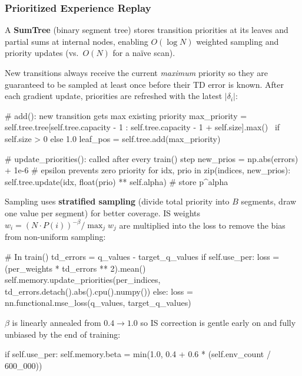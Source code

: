\documentclass[12pt,a4paper]{report}
\begin{document}
\subsubsection*{Prioritized Experience Replay}

A \textbf{SumTree} (binary segment tree) stores transition priorities at its leaves
and partial sums at internal nodes, enabling $O(\log N)$ weighted sampling and
priority updates (vs.\ $O(N)$ for a naïve scan).

New transitions always receive the current \emph{maximum} priority so they are
guaranteed to be sampled at least once before their TD error is known.
After each gradient update, priorities are refreshed with the latest $|\delta_i|$:

\begin{pycode}
# add(): new transition gets max existing priority
max_priority = self.tree.tree[self.tree.capacity - 1 :
                              self.tree.capacity - 1 + self.size].max() \
               if self.size > 0 else 1.0
leaf_pos = self.tree.add(max_priority)

# update_priorities(): called after every train() step
new_prios = np.abs(errors) + 1e-6          # epsilon prevents zero priority
for idx, prio in zip(indices, new_prios):
    self.tree.update(idx, float(prio) ** self.alpha)   # store p^alpha
\end{pycode}

Sampling uses \textbf{stratified sampling} (divide total priority into $B$ segments,
draw one value per segment) for better coverage.
IS weights $w_i = (N \cdot P(i))^{-\beta} / \max_j w_j$ are multiplied into the loss
to remove the bias from non-uniform sampling:

\begin{pycode}
# In train()
td_errors = q_values - target_q_values
if self.use_per:
    loss = (per_weights * td_errors ** 2).mean()
    self.memory.update_priorities(per_indices,
                                  td_errors.detach().abs().cpu().numpy())
else:
    loss = nn.functional.mse_loss(q_values, target_q_values)
\end{pycode}

$\beta$ is linearly annealed from $0.4 \to 1.0$ so IS correction is gentle early on
and fully unbiased by the end of training:

\begin{pycode}
if self.use_per:
    self.memory.beta = min(1.0, 0.4 + 0.6 * (self.env_count / 600_000))
\end{pycode}
\end{document}
